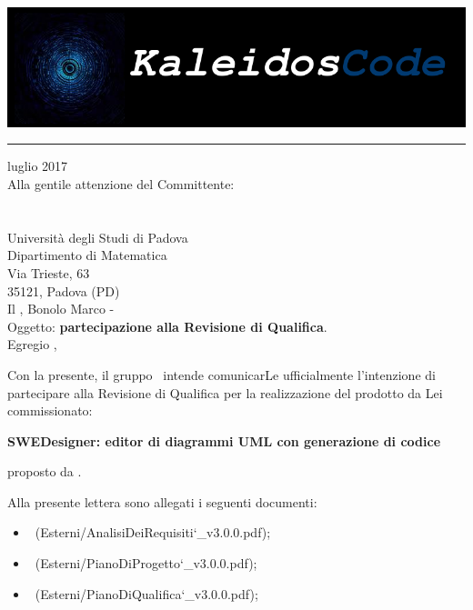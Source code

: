 \documentclass[a4paper,12pt]{article}
\author{KaleidosCode}
\date{06/07/2017}	%
\begin{document}
	\begin{titlepage}
		\includegraphics[scale=0.2]{../../../Immagini/KaleidosCodeLogo.png}
		\hrule
		\vspace{1.2cm}
		 luglio 2017\\
		\vspace{0.4cm}
		Alla gentile attenzione del Committente:\\
		\vardanega\\
		\cardin\\
		Università degli Studi di Padova\\
		Dipartimento di Matematica\\
		Via Trieste, 63\\
		35121, Padova (PD)\\
		\vspace{1.2cm}
		\flushleft Il \responsabilediprogetto, Bonolo Marco - \kaleidoscode\\
		\vspace{0.4cm}
		Oggetto: \textbf{partecipazione alla Revisione di Qualifica}.\\
		\vspace{1cm}
		Egregio \vardanega,\\
		\vspace{0.4cm}
		\par Con la presente, il gruppo \kaleidoscode\ intende comunicarLe ufficialmente l'intenzione di
		partecipare alla Revisione di Qualifica per la realizzazione del prodotto da Lei commissionato:
		\begin{center}
			\textbf{SWEDesigner: editor di diagrammi UML con generazione di codice} 
		\end{center}
		proposto da \proponente.
		\par Alla presente lettera sono allegati i seguenti documenti:
		\begin{itemize}
			\item \analisideirequisitiRQ\ (Esterni/AnalisiDeiRequisiti\char`_v3.0.0.pdf);
			\item \pianodiprogettoRQ\ (Esterni/PianoDiProgetto\char`_v3.0.0.pdf);
			\item \pianodiqualificaRQ\ (Esterni/PianoDiQualifica\char`_v3.0.0.pdf);

\end{itemize}
\end{titlepage}
\end{document}
